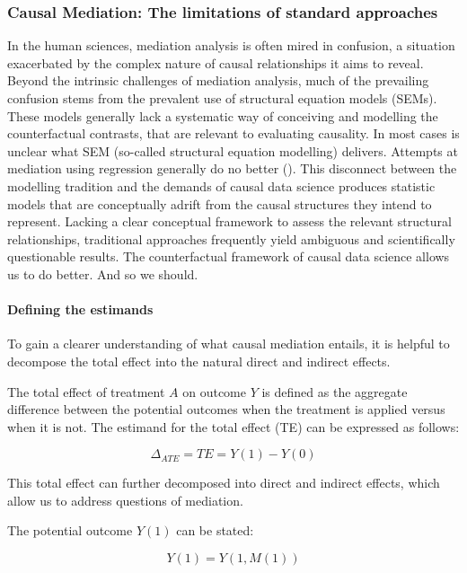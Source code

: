 \documentclass[
  singlecolumn,
  9pt]{article}
\let\oldparagraph\paragraph
\renewcommand{\paragraph}[1]{\oldparagraph{#1}\mbox{}}
\begin{document}
\subsubsection{Causal Mediation: The limitations of standard
approaches}\label{causal-mediation-the-limitations-of-standard-approaches}

In the human sciences, mediation analysis is often mired in confusion, a
situation exacerbated by the complex nature of causal relationships it
aims to reveal. Beyond the intrinsic challenges of mediation analysis,
much of the prevailing confusion stems from the prevalent use of
structural equation models (SEMs). These models generally lack a
systematic way of conceiving and modelling the counterfactual contrasts,
that are relevant to evaluating causality. In most cases is unclear what
SEM (so-called structural equation modelling) delivers. Attempts at
mediation using regression generally do no better
(). This disconnect
between the modelling tradition and the demands of causal data science
produces statistic models that are conceptually adrift from the causal
structures they intend to represent. Lacking a clear conceptual
framework to assess the relevant structural relationships, traditional
approaches frequently yield ambiguous and scientifically questionable
results. The counterfactual framework of causal data science allows us
to do better. And so we should.

\paragraph{Defining the estimands}\label{defining-the-estimands}

To gain a clearer understanding of what causal mediation entails, it is
helpful to decompose the total effect into the natural direct and
indirect effects.

The total effect of treatment \(A\) on outcome \(Y\) is defined as the
aggregate difference between the potential outcomes when the treatment
is applied versus when it is not. The estimand for the total effect (TE)
can be expressed as follows:

\[
\Delta_{ATE} = TE = Y(1) - Y(0)
\]

This total effect can further decomposed into direct and indirect
effects, which allow us to address questions of mediation.

The potential outcome \(Y(1)\) can be stated:

\[ 
Y(1) = Y(1, M(1))
\]
\end{document}
